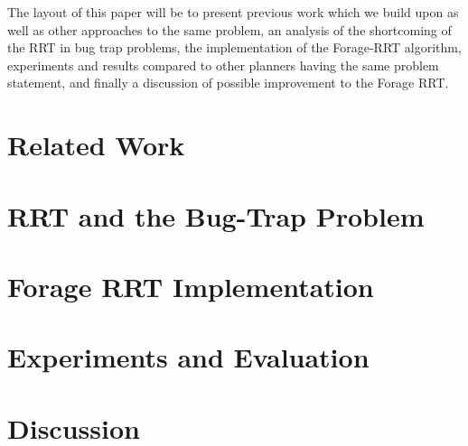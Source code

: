 \documentclass[conference]{IEEEtran}
\begin{document}
The layout of this paper will be to present previous work which we build upon as well as other approaches to the same problem, an analysis
of the shortcoming of the RRT in bug trap problems, the implementation of the Forage-RRT algorithm, experiments and results compared to
other planners having the same problem statement, and finally a discussion of possible improvement to the Forage RRT.   

\section{Related Work}
 
\section{RRT and the Bug-Trap Problem}

\section{Forage RRT Implementation}

\section{Experiments and Evaluation}

\section{Discussion}





\end{document}
